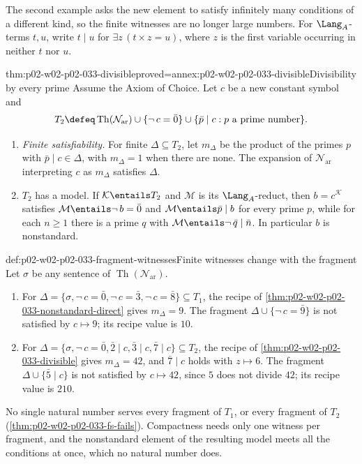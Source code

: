 The second example asks the new element to satisfy infinitely many conditions
of a different kind, so the finite witnesses are no longer large numbers.
For \(\Lang_A\)-terms \(t,u\), write \(t\mid u\) for
\(\exists z\,(t\times z=u)\), where \(z\) is the first variable occurring in
neither \(t\) nor \(u\).

\begin{hbtheorem}{thm:p02-w02-p02-033-divisible}{proved=annex:p02-w02-p02-033-divisible}{Divisibility by every prime}
Assume the Axiom of Choice.  Let \(c\) be a new constant symbol and
\[
 T_2\defeq\operatorname{Th}(\mathcal N_{\mathrm{ar}})\cup
 \{\neg\,c=\bar 0\}\cup\{\bar p\mid c:p\text{ a prime number}\}.
\]
\begin{enumerate}
  \item \emph{Finite satisfiability.}  For finite \(\Delta\subseteq T_2\),
        let \(m_\Delta\) be the product of the primes \(p\) with
        \(\bar p\mid c\in\Delta\), with \(m_\Delta=1\) when there are none.
        The expansion of \(\mathcal N_{\mathrm{ar}}\) interpreting \(c\) as
        \(m_\Delta\) satisfies \(\Delta\).
  \item \(T_2\) has a model.  If \(\mathcal K\entails T_2\) and
        \(\mathcal M\) is its \(\Lang_A\)-reduct, then
        \(b=c^{\mathcal K}\) satisfies \(\mathcal M\entails\neg\,b=\bar 0\)
        and \(\mathcal M\entails\bar p\mid b\) for every prime \(p\), while
        for each \(n\geq1\) there is a prime \(q\) with
        \(\mathcal M\entails\neg\,\bar q\mid\bar n\).  In particular \(b\) is
        nonstandard.
\end{enumerate}
\end{hbtheorem}

\begin{hbexample}{def:p02-w02-p02-033-fragment-witnesses}{Finite witnesses change with the fragment}
Let \(\sigma\) be any sentence of \(\operatorname{Th}(\mathcal N_{\mathrm{ar}})\).
\begin{enumerate}
  \item For \(\Delta=\{\sigma,\neg\,c=\bar 0,\neg\,c=\bar 3,\neg\,c=\bar 8\}
        \subseteq T_1\), the recipe of
        \cref{thm:p02-w02-p02-033-nonstandard-direct} gives
        \(m_\Delta=9\).  The fragment
        \(\Delta\cup\{\neg\,c=\bar 9\}\) is not satisfied by \(c\mapsto9\);
        its recipe value is \(10\).
  \item For \(\Delta=\{\sigma,\neg\,c=\bar 0,\bar 2\mid c,\bar 3\mid c,
        \bar 7\mid c\}\subseteq T_2\), the recipe of
        \cref{thm:p02-w02-p02-033-divisible} gives \(m_\Delta=42\), and
        \(\bar 7\mid c\) holds with \(z\mapsto6\).  The fragment
        \(\Delta\cup\{\bar 5\mid c\}\) is not satisfied by \(c\mapsto42\),
        since \(5\) does not divide \(42\); its recipe value is \(210\).
\end{enumerate}
No single natural number serves every fragment of \(T_1\), or every fragment
of \(T_2\) (\cref{thm:p02-w02-p02-033-fs-fails}).  Compactness needs only
one witness per fragment, and the nonstandard element of the resulting model
meets all the conditions at once, which no natural number does.
\end{hbexample}

